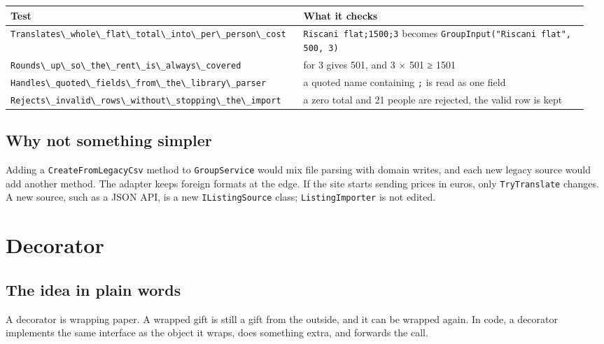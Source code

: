 \documentclass{utmreport}
\providecommand{\passthrough}[1]{#1}
\newcounter{none}
\begin{document}
{\def\LTcaptype{none} %
\begin{longtable}[]{@{}>{\raggedright\arraybackslash}p{0.480\linewidth}>{\raggedright\arraybackslash}p{0.480\linewidth}@{}}
\toprule\noalign{}
Test & What it checks \\
\midrule\noalign{}
\endhead
\bottomrule\noalign{}
\endlastfoot
\passthrough{\lstinline!Translates\_whole\_flat\_total\_into\_per\_person\_cost!} & \passthrough{\lstinline!Riscani flat;1500;3!} becomes \passthrough{\lstinline!GroupInput("Riscani flat", 500, 3)!} \\
\passthrough{\lstinline!Rounds\_up\_so\_the\_rent\_is\_always\_covered!} & 1501 for 3 gives 501, and 3 × 501 ≥ 1501 \\
\passthrough{\lstinline!Handles\_quoted\_fields\_from\_the\_library\_parser!} & a quoted name containing \passthrough{\lstinline!;!} is read as one field \\
\passthrough{\lstinline!Rejects\_invalid\_rows\_without\_stopping\_the\_import!} & a zero total and 21 people are rejected, the valid row is kept \\
\end{longtable}
}

\section{Why not something simpler}

Adding a \passthrough{\lstinline!CreateFromLegacyCsv!} method to \passthrough{\lstinline!GroupService!} would mix file parsing with domain writes, and each new legacy source would add another method. The adapter keeps foreign formats at the edge. If the site starts sending prices in euros, only \passthrough{\lstinline!TryTranslate!} changes. A new source, such as a JSON API, is a new \passthrough{\lstinline!IListingSource!} class; \passthrough{\lstinline!ListingImporter!} is not edited.

\chapter{Decorator}

\section{The idea in plain words}

A decorator is wrapping paper. A wrapped gift is still a gift from the outside, and it can be wrapped again. In code, a decorator implements the same interface as the object it wraps, does something extra, and forwards the call.
\end{document}

